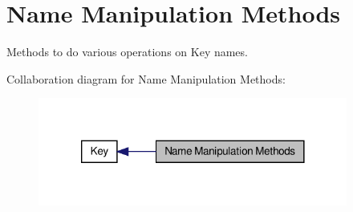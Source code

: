 \hypertarget{group__keyname}{\section{Name Manipulation Methods}
\label{group__keyname}
}


Methods to do various operations on Key names.  


Collaboration diagram for Name Manipulation Methods\-:\nopagebreak
\begin{figure}[H]
\begin{center}
\leavevmode
\includegraphics[width=288pt]{group__keyname}
\end{center}
\end{figure}
